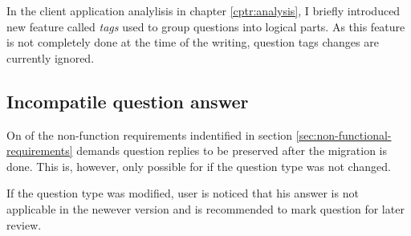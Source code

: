 In the client application analylisis in chapter \ref{cptr:analysis}, I briefly introduced new feature called \textit{tags} used to group questions into logical parts.
As this feature is not completely done at the time of the writing, question tags changes are currently ignored.

\subsection{Incompatile question answer}

On of the non-function requirements indentified in section \ref{sec:non-functional-requirements} demands question replies to be preserved after the migration is done.
This is, however, only possible for if the question type was not changed.

If the question type was modified, user is noticed that his answer is not applicable in the newever version and is recommended to mark question for later review.
